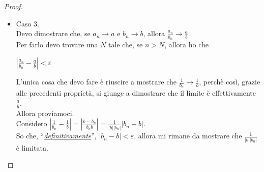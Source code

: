 \documentclass{article}
\theoremstyle{definition}
\newcommand{\virgolette}[1]{``#1''}
\begin{document}
\begin{proof}
\begin{itemize}
\begin{center}
    $|b_n(a_n-a)+a(b_n-b)|\leqslant |b_n||(a_n-a)|+|a||(b_n-b)|$
\end{center}
Considero il fatto che
\begin{center}
    $\forall \,\,\, \varepsilon>0 \,\,\, \exists \,\,\, N>0$ tale che, se $n>N$, allora $|b_n-b|<\varepsilon$
\end{center}
Considerato ciò, so che
\begin{center}
    $|a||b_n-b|\leqslant|a|\varepsilon$
\end{center}
Ora andiamo al secondo termine:
\\
Bisogna tenere conto del fatto che, se una successione tende ad un numero, allora, \underline{definitivamente}, quella successione sarà limitata, compresa tra due valori da cui non può scappare, perchè tende a qualcosa.
\\
In questo caso bisogna tenere conto del fatto che, essendo $b_n \longrightarrow b$, allora, per un certo $n>N$ e tutto il resto, si avrà che
\begin{center}
    $b-\varepsilon < b_n < b+\varepsilon$
\end{center}
Dunque, di fatto, si ha, definitivamente, $|b_n|<c$
\\
Facciamo il solito ragionamento anche per $|a_n-a|<\varepsilon$ e giungiamo alla conclusione che, mettendo tutto assieme, si ottiene:
\begin{center}
    $|a_nb_n-ab|<c\varepsilon+|a|\varepsilon=\varepsilon(c-|a|)$
\end{center}
\item Caso 3.
\\
Devo dimostrare che, se $a_n \longrightarrow a$ e $b_n \longrightarrow b$, allora $\frac{a_n}{b_n} \longrightarrow \frac{a}{b}$.
\\
Per farlo devo trovare una $N$ tale che, se $n >N$, allora ho che
\begin{center}
    $|\frac{a_n}{b_n}-\frac{a}{b}|< \varepsilon$
\end{center}
L'unica cosa che devo fare è riuscire a mostrare che $\frac{1}{b_n} \longrightarrow \frac{1}{b}$, perchè così, grazie alle precedenti proprietà, si giunge a dimostrare che il limite è effettivamente $\frac{a}{b}$.
\\
Allora proviamoci.
\\
Considero $|\frac{1}{b_n}-\frac{1}{b}|=|\frac{b-b_n}{b_nb}|=\frac{1}{|b||b_n|}|b_n-b|$.
\\
So che, \virgolette{\underline{\textit{definitivamente}}}, $|b_n-b|<\varepsilon$, allora mi rimane da mostrare che $\frac{1}{|b||b_n|}$ è limitata.

\end{itemize}
\end{proof}
\end{document}
